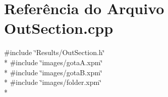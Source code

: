 \section{Referência do Arquivo Out\+Section.\+cpp}
\label{_out_section_8cpp}
{\ttfamily \#include \char`\"{}Results/\+Out\+Section.\+h\char`\"{}}\\*
{\ttfamily \#include \char`\"{}images/gota\+A.\+xpm\char`\"{}}\\*
{\ttfamily \#include \char`\"{}images/gota\+B.\+xpm\char`\"{}}\\*
{\ttfamily \#include \char`\"{}images/folder.\+xpm\char`\"{}}\\*
